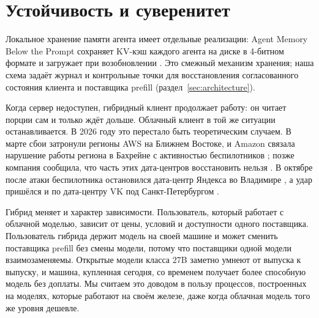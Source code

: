\section{Устойчивость и суверенитет}
\label{sec:resilience}

Локальное хранение памяти агента имеет отдельные реализации: Agent Memory Below the Prompt сохраняет
KV-кэш каждого агента на диске в 4-битном формате и загружает при возобновлении \cite{shkolnikov2026agentmemory}.
Это смежный механизм хранения; наша схема задаёт журнал и контрольные точки для восстановления
согласованного состояния клиента и поставщика prefill (раздел~\ref{sec:architecture}).

Когда сервер недоступен, гибридный клиент продолжает работу: он читает порции сам и только ждёт дольше. Облачный
клиент в той же ситуации останавливается. В 2026 году это перестало быть теоретическим случаем. В марте сбои затронули регионы AWS на Ближнем Востоке, и Amazon связала нарушение работы региона в Бахрейне
с активностью беспилотников \cite{registeraws,aljazeeraaws}; позже компания сообщила, что часть этих дата-центров
восстановить нельзя \cite{awsunrecoverable}. В октябре после атаки беспилотника остановился дата-центр Яндекса во
Владимире \cite{aljazeerayandex}, а удар пришёлся и по дата-центру VK под Санкт-Петербургом \cite{dcdvk}.

Гибрид меняет и характер зависимости. Пользователь, который работает с облачной моделью, зависит от цены, условий
и доступности одного поставщика. Пользователь гибрида держит модель на своей машине и может сменить поставщика
prefill без смены модели, потому что поставщики одной модели взаимозаменяемы. Открытые модели класса 27B заметно
умнеют от выпуска к выпуску, и машина, купленная сегодня, со временем получает более способную модель без доплаты.
Мы считаем это доводом в пользу процессов, построенных на моделях, которые работают на своём железе, даже когда
облачная модель того же уровня дешевле.
